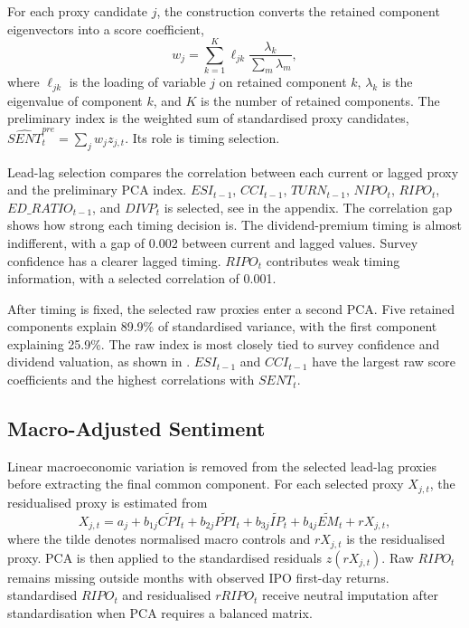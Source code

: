 \documentclass[11pt]{article}
\newcommand{\var}[1]{\ensuremath{#1}}
\begin{document}
For each proxy candidate \(j\), the construction converts the retained component eigenvectors into a score coefficient,
\begin{equation}
    w_j = \sum_{k=1}^{K} \ell_{jk}\frac{\lambda_k}{\sum_m \lambda_m},
\end{equation}
where \(\ell_{jk}\) is the loading of variable \(j\) on retained component \(k\), \(\lambda_k\) is the eigenvalue of component \(k\), and \(K\) is the number of retained components. The preliminary index is the weighted sum of standardised proxy candidates, \(\widehat{SENT}^{pre}_t=\sum_j w_j z_{j,t}\). Its role is timing selection.

Lead-lag selection compares the correlation between each current or lagged proxy and the preliminary PCA index. \var{ESI_{t-1}}, \var{CCI_{t-1}}, \var{TURN_{t-1}}, \var{NIPO_t}, \var{RIPO_t}, \var{ED\_RATIO_{t-1}}, and \var{DIVP_t} is selected, see  in the appendix. The correlation gap shows how strong each timing decision is. The dividend-premium timing is almost indifferent, with a gap of 0.002 between current and lagged values. Survey confidence has a clearer lagged timing. \var{RIPO_t} contributes weak timing information, with a selected correlation of 0.001.

After timing is fixed, the selected raw proxies enter a second PCA. Five retained components explain 89.9\% of standardised variance, with the first component explaining 25.9\%. The raw index is most closely tied to survey confidence and dividend valuation, as shown in . \var{ESI_{t-1}} and \var{CCI_{t-1}} have the largest raw score coefficients and the highest correlations with \var{SENT_t}.

\subsection{Macro-Adjusted Sentiment}
Linear macroeconomic variation is removed from the selected lead-lag proxies before extracting the final common component. For each selected proxy \(X_{j,t}\), the residualised proxy is estimated from
\begin{equation}
    X_{j,t}
    =
    a_j
    + b_{1j}\widetilde{CPI}_t
    + b_{2j}\widetilde{PPI}_t
    + b_{3j}\widetilde{IP}_t
    + b_{4j}\widetilde{EM}_t
    + rX_{j,t},
\end{equation}
where the tilde denotes normalised macro controls and \(rX_{j,t}\) is the residualised proxy. PCA is then applied to the standardised residuals \(z(rX_{j,t})\). Raw \var{RIPO_t} remains missing outside months with observed IPO first-day returns. standardised \var{RIPO_t} and residualised \var{rRIPO_t} receive neutral imputation after standardisation when PCA requires a balanced matrix.
\end{document}
